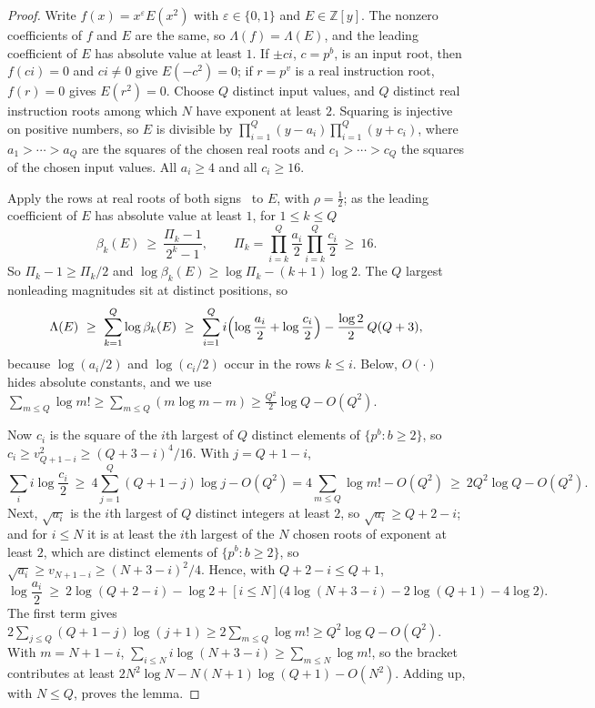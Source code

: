 \documentclass[11pt]{article}
\theoremstyle{remark}
\newcommand{\Z}{\mathbb Z}
\begin{document}
\begin{proof}
Write $f(x)=x^\varepsilon E(x^2)$ with $\varepsilon\in\{0,1\}$ and $E\in\Z[y]$.  The
nonzero coefficients of $f$ and $E$ are the same, so $\Lambda(f)=\Lambda(E)$, and the
leading coefficient of $E$ has absolute value at least $1$.  If $\pm ci$, $c=p^b$, is an
input root, then $f(ci)=0$ and $ci\ne0$ give $E(-c^2)=0$; if $r=p^v$ is a real
instruction root, $f(r)=0$ gives $E(r^2)=0$.  Choose $Q$ distinct input values, and $Q$
distinct real instruction roots among which $N$ have exponent at least $2$.  Squaring is
injective on positive numbers, so $E$ is divisible by
$\prod_{i=1}^Q(y-a_i)\prod_{i=1}^Q(y+c_i)$, where $a_1>\cdots>a_Q$ are the squares of the
chosen real roots and $c_1>\cdots>c_Q$ the squares of the chosen input values.  All
$a_i\ge4$ and all $c_i\ge16$.

Apply the rows at real roots of both signs~\cite[Theorem~4.2]{coefficient-mass-complex} to $E$,
with $\rho=\frac12$; as the leading coefficient of $E$ has absolute value at least $1$,
for $1\le k\le Q$
\[
  \beta_k(E)\ \ge\ \frac{\Pi_k-1}{2^k-1},\qquad
  \Pi_k=\prod_{i=k}^{Q}\frac{a_i}2\prod_{i=k}^{Q}\frac{c_i}2\ \ge\ 16 .
\]
So $\Pi_k-1\ge\Pi_k/2$ and $\log\beta_k(E)\ge\log\Pi_k-(k+1)\log2$.  The $Q$ largest
nonleading magnitudes sit at distinct positions, so
\[
  \Lambda(E)\ \ge\ \sum_{k=1}^Q\log\beta_k(E)
  \ \ge\ \sum_{i=1}^Q i\Bigl(\log\frac{a_i}2+\log\frac{c_i}2\Bigr)-\frac{\log2}2\,Q(Q+3),
\]
because $\log(a_i/2)$ and $\log(c_i/2)$ occur in the rows $k\le i$.  Below, $O(\cdot)$
hides absolute constants, and we use
$\sum_{m\le Q}\log m!\ge\sum_{m\le Q}(m\log m-m)\ge\frac{Q^2}2\log Q-O(Q^2)$.

Now $c_i$ is the square of the $i$th largest of $Q$ distinct elements of
$\{p^b:b\ge2\}$, so $c_i\ge v_{Q+1-i}^2\ge(Q+3-i)^4/16$.  With $j=Q+1-i$,
\[
  \sum_{i}i\log\frac{c_i}2\ \ge\ 4\sum_{j=1}^Q(Q+1-j)\log j-O(Q^2)
  =4\sum_{m\le Q}\log m!-O(Q^2)\ \ge\ 2Q^2\log Q-O(Q^2).
\]
Next, $\sqrt{a_i}$ is the $i$th largest of $Q$ distinct integers at least $2$, so
$\sqrt{a_i}\ge Q+2-i$; and for $i\le N$ it is at least the $i$th largest of the $N$ chosen
roots of exponent at least $2$, which are distinct elements of $\{p^b:b\ge2\}$, so
$\sqrt{a_i}\ge v_{N+1-i}\ge(N+3-i)^2/4$.  Hence, with $Q+2-i\le Q+1$,
\[
  \log\frac{a_i}2\ \ge\ 2\log(Q+2-i)-\log2
  +[i\le N]\bigl(4\log(N+3-i)-2\log(Q+1)-4\log2\bigr).
\]
The first term gives $2\sum_{j\le Q}(Q+1-j)\log(j+1)\ge2\sum_{m\le Q}\log m!\ge
Q^2\log Q-O(Q^2)$.  With $m=N+1-i$, $\sum_{i\le N}i\log(N+3-i)\ge\sum_{m\le N}\log m!$, so
the bracket contributes at least $2N^2\log N-N(N+1)\log(Q+1)-O(N^2)$.  Adding up, with
$N\le Q$, proves the lemma.
\end{proof}
\end{document}
